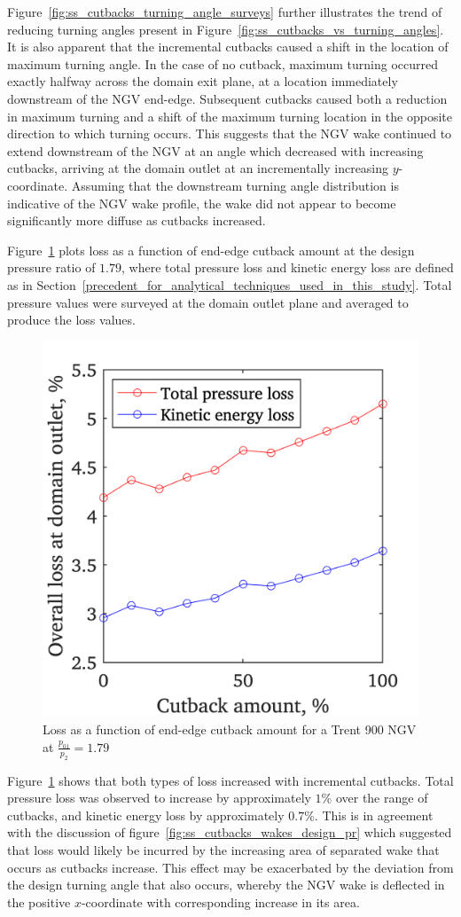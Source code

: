 \documentclass[a4paper, 11pt, oneside]{report}
\begin{document}
Figure~\ref{fig:ss_cutbacks_turning_angle_surveys} further illustrates the trend of reducing turning angles present in Figure~\ref{fig:ss_cutbacks_vs_turning_angles}. It is also apparent that the incremental cutbacks caused a shift in the location of maximum turning angle. In the case of no cutback, maximum turning occurred exactly halfway across the domain exit plane, at a location immediately downstream of the NGV end-edge. Subsequent cutbacks caused both a reduction in maximum turning and a shift of the maximum turning location in the opposite direction to which turning occurs. This suggests that the NGV wake continued to extend downstream of the NGV at an angle which decreased with increasing cutbacks, arriving at the domain outlet at an incrementally increasing $y$-coordinate. Assuming that the downstream turning angle distribution is indicative of the NGV wake profile, the wake did not appear to become significantly more diffuse as cutbacks increased.

Figure~\ref{fig:ss_cutbacks_vs_losses} plots loss as a function of end-edge cutback amount at the design pressure ratio of $1.79$, where total pressure loss and kinetic energy loss are defined as in Section~\ref{precedent_for_analytical_techniques_used_in_this_study}. Total pressure values were surveyed at the domain outlet plane and averaged to produce the loss values.

\begin{figure}[H]
	\centering
	\includegraphics[width=.45\textwidth]{figs/ss_cutbacks_vs_losses.png}
	\caption{Loss as a function of end-edge cutback amount for a Trent 900 NGV at $\frac{p_{01}}{p_2}=1.79$}
    \label{fig:ss_cutbacks_vs_losses}
\end{figure}

Figure~\ref{fig:ss_cutbacks_vs_losses} shows that both types of loss increased with incremental cutbacks. Total pressure loss was observed to increase by approximately $1\%$ over the range of cutbacks, and kinetic energy loss by approximately $0.7\%$. This is in agreement with the discussion of figure~\ref{fig:ss_cutbacks_wakes_design_pr} which suggested that loss would likely be incurred by the increasing area of separated wake that occurs as cutbacks increase. This effect may be exacerbated by the deviation from the design turning angle that also occurs, whereby the NGV wake is deflected in the positive $x$-coordinate with corresponding increase in its area.
\end{document}
